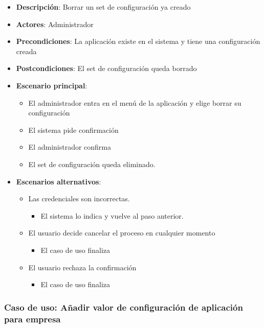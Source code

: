 \documentclass[12pt,a4paperpaper,]{report}
\providecommand{\tightlist}{%
  \setlength{\itemsep}{0pt}\setlength{\parskip}{0pt}}
\begin{document}
\begin{itemize}
\tightlist
\item
  \textbf{Descripción}: Borrar un set de configuración ya creado
\item
  \textbf{Actores}: Administrador
\item
  \textbf{Precondiciones}: La aplicación existe en el sistema y tiene
  una configuración creada
\item
  \textbf{Postcondiciones}: El set de configuración queda borrado
\item
  \textbf{Escenario principal}:

  \begin{itemize}
  \tightlist
  \item
    El administrador entra en el menú de la aplicación y elige borrar su
    configuración
  \item
    El sistema pide confirmación
  \item
    El administrador confirma
  \item
    El set de configuración queda eliminado.
  \end{itemize}
\item
  \textbf{Escenarios alternativos}:

  \begin{itemize}
  \tightlist
  \item
    Las credenciales son incorrectas.

    \begin{itemize}
    \tightlist
    \item
      El sistema lo indica y vuelve al paso anterior.
    \end{itemize}
  \item
    El usuario decide cancelar el proceso en cualquier momento

    \begin{itemize}
    \tightlist
    \item
      El caso de uso finaliza
    \end{itemize}
  \item
    El usuario rechaza la confirmación

    \begin{itemize}
    \tightlist
    \item
      El caso de uso finaliza
    \end{itemize}
  \end{itemize}
\end{itemize}

\subsubsection{Caso de uso: Añadir valor de configuración de aplicación
para
empresa}\label{caso-de-uso-auxf1adir-valor-de-configuraciuxf3n-de-aplicaciuxf3n-para-empresa}
\end{document}
